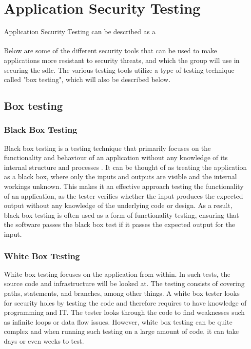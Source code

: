 \section{Application Security Testing}
Application Security Testing can be described as a \cite{AST}
\\~\\
Below are some of the different security tools that can be used to make applications more resistant to security threats, and which the group will use in securing the \acrshort{sdlc}. 
The various testing tools utilize a type of testing technique called "box testing", which will also be described below. 

\subsection{Box testing}
\label{boxtesting}

\subsubsection{Black Box Testing}
\label{BlackBoxTesting}
Black box testing is a testing technique that primarily focuses on the functionality and behaviour of an application without any knowledge of its internal structure and processes  \cite{blackbox}. It can be thought of as treating the application as a black box, where   only the inputs and outputs are visible and the internal workings unknown. This makes it an effective approach testing the functionality of an application, as the tester verifies whether the input produces the expected output without any knowledge of the underlying code or design. As a result, black box testing is often used as a form of functionality testing\cite{BlackBoxTestingFunctional}, ensuring that the software passes the black box test if it passes the expected output for the input.


\subsubsection{White Box Testing}
White box testing focuses on the application from within. In such tests, the source code and infrastructure will be looked at. The testing consists of covering paths, statements, and branches, among other things. A white box tester looks for security holes by testing the code and therefore requires to have knowledge of programming and IT. The tester looks through the code to find weaknesses such as infinite loops or data flow issues. However, white box testing can be quite complex and when running such testing on a large amount of code, it can take days or even weeks to test. \cite{whitebox}

